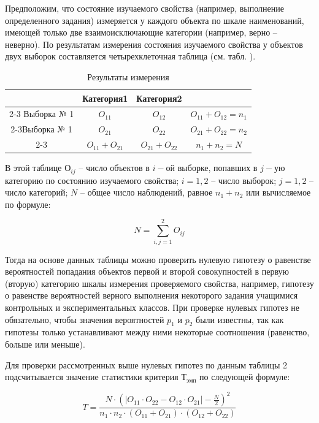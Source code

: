 \documentclass[12pt]{article}
\begin{document}
\bigskip
Предположим, что состояние изучаемого свойства (например, выполнение определенного задания) измеряется у каждого объекта по шкале наименований, имеющей только две взаимоисключающие категории (например, верно – неверно). По результатам измерения состояния изучаемого свойства у объектов двух выборок составляется четырехклеточная таблица (см. табл. ).

\begin{table}[h]
    \centering
    \caption{Результаты измерения}
    \bigskip
    \begin{tabular}{c|c|c|c} 
         &Категория1&Категория2&  \\
         \cline{2-3} Выборка № 1&\textit{$O_{11}$}&\textit{$O_{12}$}&\textit{$O_{11} + O_{12} = n_1$} \\
         \cline{2-3}Выборка № 1&\textit{$O_{21}$}&\textit{$O_{22}$}&\textit{$O_{21} + O_{22} = n_2$} \\
         \cline{2-3}&\textit{$O_{11} + O_{21}$}&\textit{$O_{21} + O_{22}$}&\textit{$n_1 + n_2 = N$}  \\
    \end{tabular}
\end{table}
 
В этой таблице $О_{ij}$ – число объектов в $i-ой$ выборке, попавших в $j-ую$ категорию по состоянию изучаемого свойства; $i=1,2$ – число выборок; $j=1,2$ – число категорий; $N$ – общее число наблюдений, равное  $n_1+n_2$ или вычисляемое по формуле:

\begin{equation}
    N=\sum_{i,j=1}^{2} O_{ij}
\end{equation}

Тогда на основе данных таблицы  можно проверить нулевую гипотезу о равенстве вероятностей попадания объектов первой и второй совокупностей в первую (вторую) категорию шкалы измерения проверяемого свойства, например, гипотезу о равенстве вероятностей верного выполнения некоторого задания учащимися контрольных и экспериментальных классов.
При проверке нулевых гипотез не обязательно, чтобы значения вероятностей $p_1$ и $p_2$ были известны, так как гипотезы только устанавливают между ними некоторые соотношения (равенство, больше или меньше).

Для проверки рассмотренных выше нулевых гипотез по данным таблицы 2 подсчитывается значение статистики критерия $Т_{эмп}$ по следующей формуле:

\begin{equation}
    T=\frac{N\cdot (|O_{11} \cdot O_{22} -O_{12} \cdot O_{21}| - \frac{N}{2})^2}{n_1 \cdot n_2 \cdot (O_{11} + O_{21}) \cdot (O_{12} + O_{22})}
\end{equation}
                                            
\end{document}

